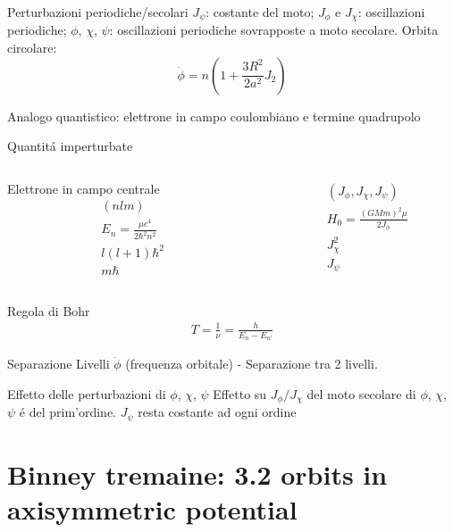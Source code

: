 \begin{wordonframe}{Perturbazioni periodiche/secolari}
$J_{\psi}$: costante del moto; $J_{\phi}$ e $J_{\chi}$: oscillazioni periodiche; $\phi$, $\chi$, $\psi$: oscillazioni periodiche sovrapposte a moto secolare. 
Orbita circolare:
\begin{equation*}
\dot{\phi}=n(1+\frac{3R^2}{2a^2}J_2)
\end{equation*}
\end{wordonframe}

\begin{frame}{Analogo quantistico: elettrone in campo coulombiano e termine quadrupolo}
\begin{block}{Quantit\'a imperturbate}
\begin{columns}
\begin{column}{0.5\textwidth}
Elettrone in campo centrale
\begin{align*}
&(nlm)\\
&E_n=\frac{\mu e^4}{2\hbar^2n^2}\\
&l(l+1)\hbar^2\\
&m\hbar
\end{align*}
\end{column}
\begin{column}{0.5\textwidth}
\begin{align*}
&(J_{\phi},J_{\chi},J_{\psi})\\
&H_0=\frac{(GMm)^2\mu}{2J_{\phi}}\\
&J_{\chi}^2\\
&J_{\psi}
\end{align*}
\end{column}
\end{columns}
\end{block}
\begin{block}{Regola di Bohr}
\begin{align*}
T=\frac{1}{\nu}=\frac{h}{E_n-E_{n'}}
\end{align*}
\end{block}
\begin{block}{Separazione Livelli}
$\dot{\phi}$ (frequenza orbitale) - Separazione tra 2 livelli.
\end{block}
\end{frame}

\begin{wordonframe}{Effetto delle perturbazioni di $\phi$, $\chi$, $\psi$}
Effetto su $J_{\phi}/J_{\chi}$ del moto secolare di $\phi$, $\chi$, $\psi$ \'e del prim'ordine.
$J_{\psi}$ resta costante ad ogni ordine
\end{wordonframe}

\section{Binney tremaine: 3.2 orbits in axisymmetric potential}
